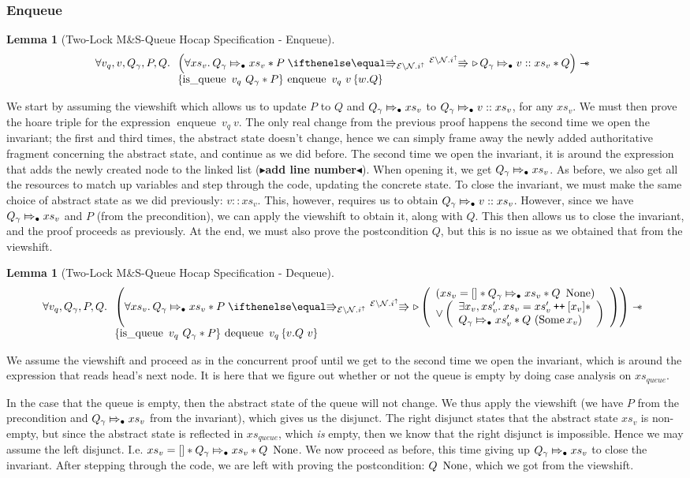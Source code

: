 \documentclass[a4paper, 11pt]{report}
\newtheorem{lemma}[theorem]{Lemma}
\newcommand{\enqueue}{\operatorname{enqueue}}
\newcommand{\dequeue}{\operatorname{dequeue}}
\newcommand{\tlmsq}{Two-Lock M\&S-Queue\xspace}
\newcommand{\isqueue}{\operatorname{is\_queue}}
\newcommand{\Qg}{Q_\gname}
\newcommand\catenate{\mathbin{\text{\ttfamily\upshape ++}}}
\newcommand{\Nl}{\ensuremath{\mathcal{N}}}
\newcommand{\abstractstateauth}[2]{#1 \Mapsto_{\bullet} #2}
\newcommand{\tlhocapspecenq}{\All v_q, v, Q_\gname, P, Q.
\begin{array}[t]{l}
\left(\All xs_v . \abstractstateauth{\Qg}{xs_v} \star P \vs[\mask\setminus\Nl.i^\uparrow] \later \abstractstateauth{\Qg}{v :: xs_v} \star Q \right)
\wand\\
\hoare{\isqueue \ v_q \ Q_\gname \star P}{\enqueue\ v_q\ v}{w . Q}
\end{array}}
\newcommand{\tlhocapspecdeq}{\All v_q, Q_\gname, P, Q.
\begin{array}[t]{l}
\left(\All xs_v . \abstractstateauth{\Qg}{xs_v} \star P \vs[\mask\setminus\Nl.i^\uparrow] \later
  \left(
    \begin{array}{l}
      (xs_v = [] \star \abstractstateauth{\Qg}{xs_v} \star Q \ \None)\\
      \lor
      \left(
        \begin{array}{l}
          \Exists x_v, xs_v' . xs_v = xs_v' \catenate [x_v] \star\\
          \abstractstateauth{\Qg}{xs_v'} \star Q \ (\Some{x_v})
        \end{array}
        \right)
    \end{array}
  \right) \right)
\wand\\
\hoare{\isqueue \ v_q \ Q_\gname \star P}{\dequeue\ v_q}{v . Q\ v}
\end{array}}
\newcommand{\todo}[1]{{\color[rgb]{.5,0,0}\textbf{$\blacktriangleright$#1$\blacktriangleleft$}}}
\begin{document}
\subsubsection{Enqueue}
\begin{lemma}[\tlmsq Hocap Specification - Enqueue]\label{TLMSQ:spec:hocap:enqueue}
  \begin{equation*}
    \tlhocapspecenq
  \end{equation*}
\end{lemma}
We start by assuming the viewshift which allows us to update $P$ to $Q$ and $\abstractstateauth{\Qg}{xs_v}$ to $\abstractstateauth{\Qg}{v :: xs_v}$, for any $xs_v$. We must then prove the hoare triple for the expression $\enqueue \ v_q \ v$. The only real change from the previous proof happens the second time we open the invariant; the first and third times, the abstract state doesn't change, hence we can simply frame away the newly added authoritative fragment concerning the abstract state, and continue as we did before. The second time we open the invariant, it is around the expression that adds the newly created node to the linked list (\todo{add line number}). When opening it, we get $\abstractstateauth{\Qg}{xs_v}$. As before, we also get all the resources to match up variables and step through the code, updating the concrete state. To close the invariant, we must make the same choice of abstract state as we did previously: $v :: xs_v$. This, however, requires us to obtain $\abstractstateauth{\Qg}{v :: xs_v}$. However, since we have $\abstractstateauth{\Qg}{xs_v}$ and $P$ (from the precondition), we can apply the viewshift to obtain it, along with $Q$. This then allows us to close the invariant, and the proof proceeds as previously. At the end, we must also prove the postcondition $Q$, but this is no issue as we obtained that from the viewshift.

\begin{lemma}[\tlmsq Hocap Specification - Dequeue]\label{TLMSQ:spec:hocap:dequeue}
  \begin{equation*}
    \tlhocapspecdeq
  \end{equation*}
\end{lemma}
We assume the viewshift and proceed as in the concurrent proof until we get to the second time we open the invariant, which is around the expression that reads head's next node. It is here that we figure out whether or not the queue is empty by doing case analysis on $xs_{queue}$.

In the case that the queue is empty, then the abstract state of the queue will not change. We thus apply the viewshift (we have $P$ from the precondition and $\abstractstateauth{\Qg}{xs_v}$ from the invariant), which gives us the disjunct. The right disjunct states that the abstract state $xs_v$ is non-empty, but since the abstract state is reflected in $xs_{queue}$, which \emph{is} empty, then we know that the right disjunct is impossible. Hence we may assume the left disjunct. I.e. $xs_v = [] \star \abstractstateauth{\Qg}{xs_v} \star Q \ \None$. We now proceed as before, this time giving up $\abstractstateauth{\Qg}{xs_v}$ to close the invariant. After stepping through the code, we are left with proving the postcondition: $Q \ \operatorname{None}$, which we got from the viewshift.
\end{document}
